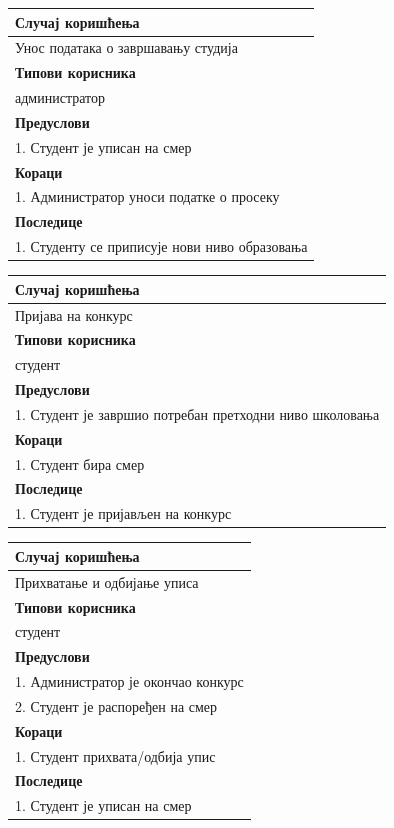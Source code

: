 \documentclass[a4paper]{article}
\begin{document}
\begin{table}[H]
    \centering
    \begin{tabular}{|l|}
    \hline
    \textbf{Случај коришћења} \\ \hline
     Унос података о завршавању студија \\ \hline
     \textbf{Типови корисника} \\ \hline
     администратор \\ \hline
     \textbf{Предуслови} \\ \hline
     1. Студент је уписан на смер\\ \hline
     \textbf{Кораци} \\ \hline
     1. Администратор уноси податке о просеку\\ \hline
     \textbf{Последице} \\ \hline
     1. Студенту се приписује нови ниво образовања\\ \hline
    \end{tabular}
\end{table}

\begin{table}[H]
    \centering
    \begin{tabular}{|l|}
    \hline
    \textbf{Случај коришћења} \\ \hline
     Пријава на конкурс \\ \hline
     \textbf{Типови корисника} \\ \hline
     студент \\ \hline
     \textbf{Предуслови} \\ \hline
     1. Студент је завршио потребан претходни ниво школовања\\ \hline
     \textbf{Кораци} \\ \hline
     1. Студент бира смер\\ \hline
     \textbf{Последице} \\ \hline
     1. Студент је пријављен на конкурс\\ \hline
    \end{tabular}
\end{table}

\begin{table}[H]
    \centering
    \begin{tabular}{|l|}
    \hline
    \textbf{Случај коришћења} \\ \hline
     Прихватање и одбијање уписа \\ \hline
     \textbf{Типови корисника} \\ \hline
     студент \\ \hline
     \textbf{Предуслови} \\ \hline
     1. Администратор је окончао конкурс\\
     2. Студент је распоређен на смер\\ \hline
     \textbf{Кораци} \\ \hline
     1. Студент прихвата/одбија упис\\ \hline
     \textbf{Последице} \\ \hline
     1. Студент је уписан на смер\\ \hline
    \end{tabular}
\end{table}
\end{document}
